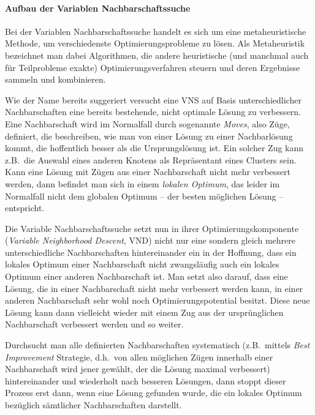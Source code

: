 \documentclass[paper=a4,fontsize=12pt]{scrartcl}
\begin{document}
\paragraph{Aufbau der Variablen Nachbarschaftssuche}{
Bei der Variablen Nachbarschaftssuche handelt es sich um eine metaheuristische Methode, um verschiedenste Optimierungsprobleme zu lösen. Als Metaheuristik bezeichnet man dabei Algorithmen, die andere heuristische (und manchmal auch für Teilprobleme exakte) Optimierungsverfahren steuern und deren Ergebnisse sammeln und kombinieren.

Wie der Name bereits suggeriert versucht eine VNS auf Basis unterschiedlicher Nachbarschaften eine bereits bestehende, nicht optimale Lösung zu verbessern. Eine Nachbarschaft wird im Normalfall durch sogenannte \emph{Moves}, also Züge, definiert, die be\-schrei\-ben, wie man von einer Lösung zu einer Nachbarlösung kommt, die hoffentlich besser als die Ursprungslösung ist. Ein solcher Zug kann z.B.\ die Auswahl eines anderen Knotens als Repräsentant eines Clusters sein. Kann eine Lösung mit Zügen aus einer Nachbarschaft nicht mehr verbessert werden, dann befindet man sich in einem \emph{lokalen Optimum}, das leider im Normalfall nicht dem globalen Optimum -- der besten möglichen Lösung -- entspricht.

Die Variable Nachbarschaftssuche setzt nun in ihrer Optimierungskomponente (\emph{Variable Neighborhood Descent}, VND) nicht nur eine sondern gleich mehrere unterschiedliche Nachbarschaften hintereinander ein in der Hoffnung, dass ein lokales Optimum einer Nachbarschaft nicht zwangsläufig auch ein lokales Optimum einer anderen Nachbarschaft ist. Man setzt also darauf, dass eine Lösung, die in einer Nachbarschaft nicht mehr verbessert werden kann, in einer anderen Nachbarschaft sehr wohl noch Optimierungspotential besitzt. Diese neue Lösung kann dann vielleicht wieder mit einem Zug aus der ursprünglichen Nachbarschaft verbessert werden und so weiter.

Durchsucht man alle definierten Nachbarschaften systematisch (z.B.\ mittels \emph{Best Improvement} Strategie, d.h.\ von allen möglichen Zügen innerhalb einer Nachbarschaft wird jener gewählt, der die Lösung maximal verbessert) hintereinander und wiederholt nach besseren Lösungen, dann stoppt dieser Prozess erst dann, wenn eine Lösung gefunden wurde, die ein lokales Optimum bezüglich sämtlicher Nachbarschaften darstellt.

}
\end{document}
